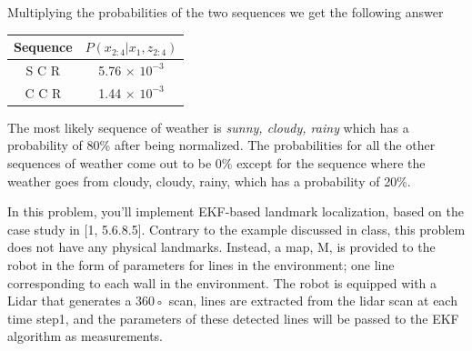 \documentclass[answers]{exam}
\begin{document}
\begin{questions}
\begin{parts}
\begin{solution}
            Multiplying the probabilities of the two sequences we get the following answer

            \newpage

            \begin{tabular}[h]{|c|c|}
                \hline
                Sequence & $P(x_{2:4}|x_1, z_{2:4})$ \\
                \hline
                S C R    & 5.76 $\times$ $10^{-3}$   \\
                \hline
                C C R    & 1.44 $\times$ $10^{-3}$   \\
                \hline
            \end{tabular}

            The most likely sequence of weather is \textit{sunny, cloudy, rainy} which has
            a probability of 80\% after being normalized. The probabilities for all the
            other sequences of weather come out to be 0\% except for the sequence where the
            weather goes from cloudy, cloudy, rainy, which has a probability of 20\%.
        \end{solution}
    \end{parts}

    \question[20]
    In this problem, you'll implement EKF-based landmark localization, based on the case study
    in [1, 5.6.8.5]. Contrary to the example discussed in class, this problem does not have any
    physical landmarks. Instead, a map, M, is provided to the robot in the form of parameters for
    lines in the environment; one line corresponding to each wall in the environment. The robot
    is equipped with a Lidar that generates a 360◦ scan, lines are extracted from the lidar scan
    at each time step1, and the parameters of these detected lines will be passed to the EKF
    algorithm as measurements.
\end{questions}
\end{document}
